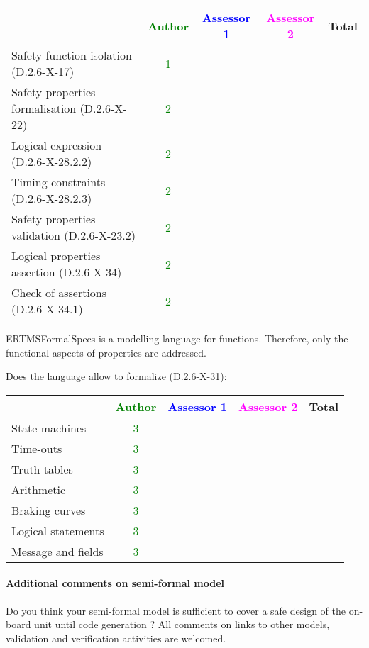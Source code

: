 \begin{tabular}{|l | c | c | c | c|}
\hline
& \textcolor{green}{Author} & \textcolor{blue}{Assessor 1} & \textcolor{magenta}{Assessor 2} & Total \\
\hline 
Safety function isolation (D.2.6-X-17)  & \textcolor{green}{1} & & &  \\
\hline 
Safety properties formalisation (D.2.6-X-22)  & \textcolor{green}{2} & & &  \\
\hline
Logical expression (D.2.6-X-28.2.2)  & \textcolor{green}{2} & & &  \\
\hline
Timing constraints (D.2.6-X-28.2.3)  & \textcolor{green}{2} & & &  \\
\hline
Safety properties validation (D.2.6-X-23.2)  & \textcolor{green}{2} & & &  \\
\hline
Logical properties assertion (D.2.6-X-34)  & \textcolor{green}{2} & & &  \\
\hline
Check  of assertions (D.2.6-X-34.1)  & \textcolor{green}{2} & & &  \\
\hline
\end{tabular}

\begin{author_comment}
ERTMSFormalSpecs is a modelling language for functions. Therefore, only the functional aspects of properties are addressed.  
\end{author_comment}
Does the language allow to  formalize (D.2.6-X-31):

\begin{tabular}{|l | c | c | c | c|}
\hline
& \textcolor{green}{Author} & \textcolor{blue}{Assessor 1} & \textcolor{magenta}{Assessor 2} & Total \\
\hline 
State machines  & \textcolor{green}{3} & & &  \\
\hline
Time-outs  & \textcolor{green}{3} & & &  \\
\hline
Truth tables  & \textcolor{green}{3} & & &  \\
\hline
Arithmetic  & \textcolor{green}{3} & & &  \\
\hline
Braking curves  & \textcolor{green}{3} & & &  \\
\hline
Logical statements & \textcolor{green}{3} & & &  \\
\hline
Message and fields & \textcolor{green}{3} & & &  \\
\hline
\end{tabular}

\paragraph{Additional comments on semi-formal  model} Do you think your semi-formal  model is sufficient to cover a safe design of the on-board unit until code generation ?
All comments on links to  other models, validation and verification activities are welcomed.

